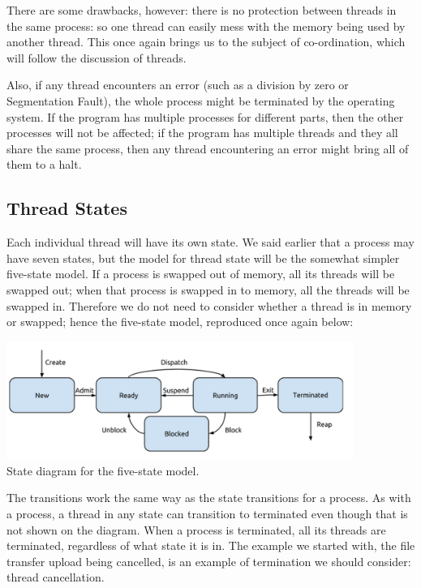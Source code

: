 There are some drawbacks, however: there is no protection between threads in the same process: so one thread can easily mess with the memory being used by another thread. This once again brings us to the subject of co-ordination, which will follow the discussion of threads.

Also, if any thread encounters an error (such as a division by zero or Segmentation Fault), the whole process might be terminated by the operating system. If the program has multiple processes for different parts, then the other processes will not be affected; if the program has multiple threads and they all share the same process, then any thread encountering an error might bring all of them to a halt.


\subsection*{Thread States}
Each individual thread will have its own state. We said earlier that a process may have seven states, but the model for thread state will be the somewhat simpler five-state model. If a process is swapped out of memory, all its threads will be swapped out; when that process is swapped in to memory, all the threads will be swapped in. Therefore we do not need to consider whether a thread is in memory or swapped; hence the five-state model, reproduced once again below:

\begin{center}
\includegraphics[width=0.85\textwidth]{images/5-state-model.png}\\
State diagram for the five-state model.
\end{center}

The transitions work the same way as the state transitions for a process. As with a process, a thread in any state can transition to terminated even though that is not shown on the diagram. When a process is terminated, all its threads are terminated, regardless of what state it is in. The example we started with, the file transfer upload being cancelled, is an example of termination we should consider: thread cancellation.


